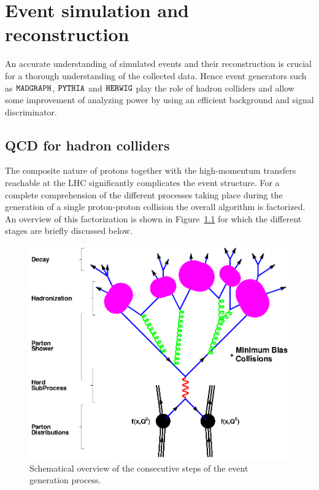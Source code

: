 \chapter{Event simulation and reconstruction} \label{chp:labelTitle}

An accurate understanding of simulated events and their reconstruction is crucial for a thorough understanding of the collected data. Hence event generators such as $\texttt{MADGRAPH}$, $\texttt{PYTHIA}$ and $\texttt{HERWIG}$ play the role of hadron colliders and allow some improvement of analyzing power by using an efficient background and signal discriminator.

\section{QCD for hadron colliders} \label{sec::QCDHadron}

The composite nature of protons together with the high-momentum transfers reachable at the LHC significantly complicates the event structure. 
For a complete comprehension of the different processes taking place during the generation of a single proton-proton collision the overall algorithm is factorized.
An overview of this factorization is shown in Figure~\ref{fig::EvtShower} for which the different stages are briefly discussed below.

\begin{figure}[htb]
 \centering
 \includegraphics[width = 0.8 \textwidth]{Chapters/Chapter3/Figures/f_shg_event.eps}
 \caption{Schematical overview of the consecutive steps of the event generation process.}  \label{fig::EvtShower}
\end{figure}

